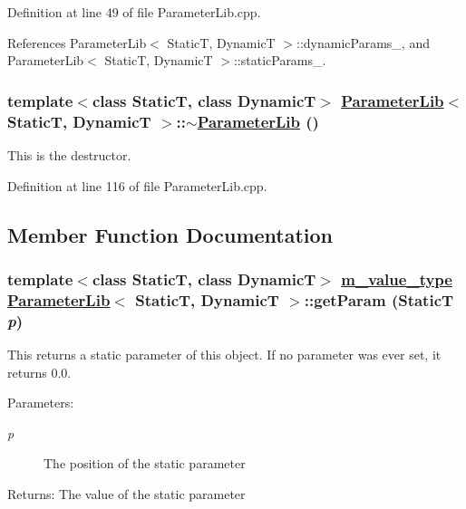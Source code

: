 Definition at line 49 of file Parameter\-Lib.cpp.

References Parameter\-Lib$<$ Static\-T, Dynamic\-T $>$::dynamic\-Params\_\-, and Parameter\-Lib$<$ Static\-T, Dynamic\-T $>$::static\-Params\_\-.\hypertarget{classParameterLib_a3}{
\subsubsection[$\sim$ParameterLib]{\setlength{\rightskip}{0pt plus 5cm}template$<$class Static\-T, class Dynamic\-T$>$ \hyperlink{classParameterLib}{Parameter\-Lib}$<$ Static\-T, Dynamic\-T $>$::$\sim$\hyperlink{classParameterLib}{Parameter\-Lib} ()}}
\label{classParameterLib_a3}


This is the destructor. 

Definition at line 116 of file Parameter\-Lib.cpp.

\subsection{Member Function Documentation}
\hypertarget{classParameterLib_a8}{
\subsubsection[getParam]{\setlength{\rightskip}{0pt plus 5cm}template$<$class Static\-T, class Dynamic\-T$>$ \hyperlink{Types_8h_a3}{m\_\-value\_\-type} \hyperlink{classParameterLib}{Parameter\-Lib}$<$ Static\-T, Dynamic\-T $>$::get\-Param (Static\-T {\em p})}}
\label{classParameterLib_a8}


This returns a static parameter of this object. If no parameter was ever set, it returns 0.0. \begin{Desc}
\item[Parameters:]
\begin{description}
\item[{\em p}]The position of the static parameter \end{description}
\end{Desc}
\begin{Desc}
\item[Returns:]The value of the static parameter \end{Desc}


